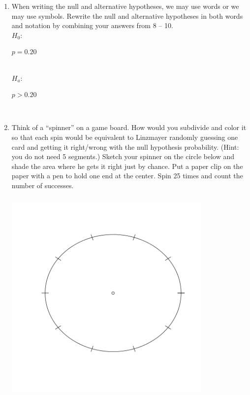\begin{enumerate}
\begin{key}
{\it Yes}
\end{key}


   \item \label{ESP-hyps} When writing the null and alternative
     hypotheses, we may use words or we may use symbols.  Rewrite the
     null and alternative hypotheses in both words and notation by
     combining your answers
     from 8 -- 10.\\
     $H_0$:
\begin{students}
  \vspace{1.2cm}
\end{students}
\begin{key}
{\it $p = 0.20$}
\end{key}
\\
     $H_a$:
\begin{students}
  \vspace{1.2cm}
\end{students}
\begin{key}
{\it $p > 0.20$}
\end{key}
\\
     \item Think of a ``spinner'' on a game board. How would you
       subdivide and color it so that each spin would be equivalent to
       Linzmayer randomly guessing one card and getting it right/wrong
       with the null hypothesis probability.  (Hint: you do not need 5
       segments.) Sketch your spinner on the circle below and shade the area
       where he gets it right just by chance. Put a paper clip on the
       paper with a pen to hold one end at the center.  Spin 25 times
       and count the number of successes.

       \includegraphics[width=4in, height = 4.2in]{../plots/spinnerCircle.png}
\vspace{-1cm}


\end{enumerate}
